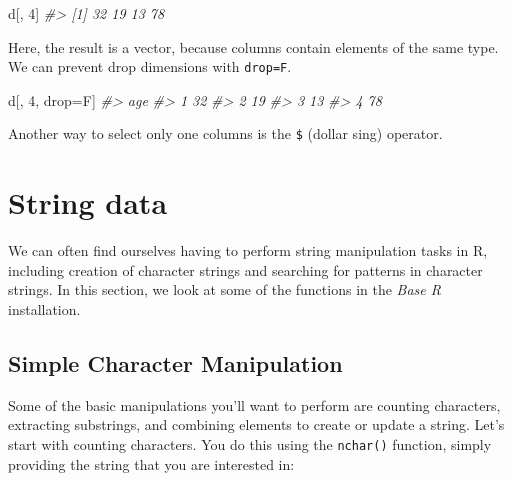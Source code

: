 \documentclass[
]{book}
\newenvironment{Shaded}{\begin{snugshade}}{\end{snugshade}}
\newcommand{\CommentTok}[1]{\textcolor[rgb]{0.56,0.35,0.01}{\textit{#1}}}
\newcommand{\DecValTok}[1]{\textcolor[rgb]{0.00,0.00,0.81}{#1}}
\newcommand{\NormalTok}[1]{#1}
\newcommand{\OtherTok}[1]{\textcolor[rgb]{0.56,0.35,0.01}{#1}}
\newcommand{\SpecialCharTok}[1]{\textcolor[rgb]{0.00,0.00,0.00}{#1}}
\begin{document}
\begin{Shaded}
\begin{Highlighting}[]
\NormalTok{d[, }\DecValTok{4}\NormalTok{]}
\CommentTok{\#\textgreater{} [1] 32 19 13 78}
\end{Highlighting}
\end{Shaded}

Here, the result is a vector, because columns contain elements of the same type.
We can prevent drop dimensions with \texttt{drop=F}.

\begin{Shaded}
\begin{Highlighting}[]
\NormalTok{d[, }\DecValTok{4}\NormalTok{, drop}\OtherTok{=}\NormalTok{F]}
\CommentTok{\#\textgreater{}   age}
\CommentTok{\#\textgreater{} 1  32}
\CommentTok{\#\textgreater{} 2  19}
\CommentTok{\#\textgreater{} 3  13}
\CommentTok{\#\textgreater{} 4  78}
\end{Highlighting}
\end{Shaded}

Another way to select only one columns is the \texttt{\$} (dollar sing) operator.

\begin{Shaded}
\end{Shaded}

\hypertarget{string-data}{%
\section{String data}\label{string-data}}

We can often find ourselves having to perform string manipulation tasks in R, including creation of character strings and searching for patterns in character strings. In this section, we look at some of the functions in the \emph{Base R} installation.

\hypertarget{simple-character-manipulation}{%
\subsection{Simple Character Manipulation}\label{simple-character-manipulation}}

Some of the basic manipulations you'll want to perform are counting characters, extracting substrings, and combining elements to create or update a string. Let's start with counting characters. You do this using the \texttt{nchar()} function, simply providing the string that you are interested in:
\end{document}
